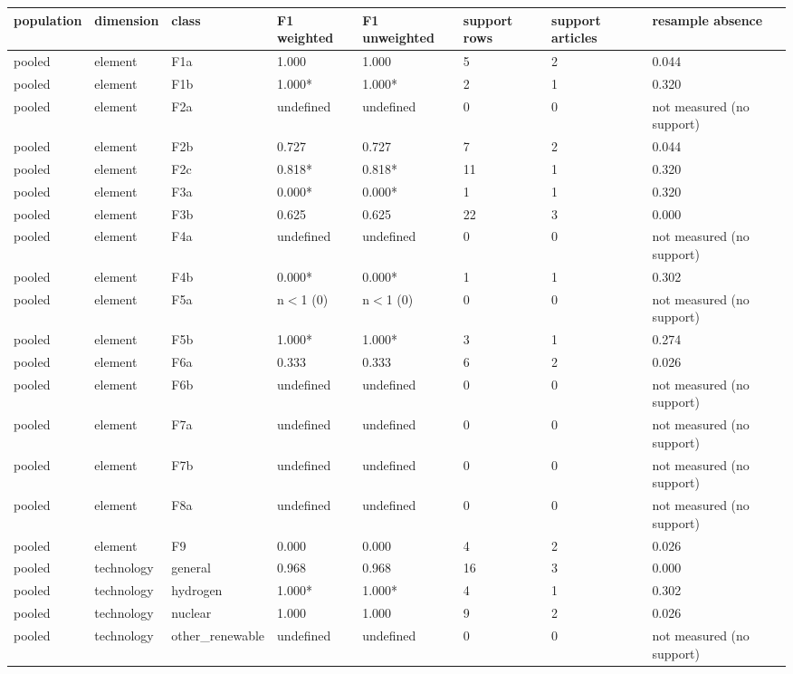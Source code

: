 \begin{table}[htbp]
\centering
\small
\begin{tabular}{llllllll}
\toprule
\textbf{population} & \textbf{dimension} & \textbf{class} & \textbf{F1 weighted} & \textbf{F1 unweighted} & \textbf{support rows} & \textbf{support articles} & \textbf{resample absence} \\
\midrule
pooled & element & F1a & 1.000 & 1.000 & 5 & 2 & 0.044 \\
pooled & element & F1b & 1.000* & 1.000* & 2 & 1 & 0.320 \\
pooled & element & F2a & undefined & undefined & 0 & 0 & not measured (no support) \\
pooled & element & F2b & 0.727 & 0.727 & 7 & 2 & 0.044 \\
pooled & element & F2c & 0.818* & 0.818* & 11 & 1 & 0.320 \\
pooled & element & F3a & 0.000* & 0.000* & 1 & 1 & 0.320 \\
pooled & element & F3b & 0.625 & 0.625 & 22 & 3 & 0.000 \\
pooled & element & F4a & undefined & undefined & 0 & 0 & not measured (no support) \\
pooled & element & F4b & 0.000* & 0.000* & 1 & 1 & 0.302 \\
pooled & element & F5a & n$<$1 (0) & n$<$1 (0) & 0 & 0 & not measured (no support) \\
pooled & element & F5b & 1.000* & 1.000* & 3 & 1 & 0.274 \\
pooled & element & F6a & 0.333 & 0.333 & 6 & 2 & 0.026 \\
pooled & element & F6b & undefined & undefined & 0 & 0 & not measured (no support) \\
pooled & element & F7a & undefined & undefined & 0 & 0 & not measured (no support) \\
pooled & element & F7b & undefined & undefined & 0 & 0 & not measured (no support) \\
pooled & element & F8a & undefined & undefined & 0 & 0 & not measured (no support) \\
pooled & element & F9 & 0.000 & 0.000 & 4 & 2 & 0.026 \\
pooled & technology & general & 0.968 & 0.968 & 16 & 3 & 0.000 \\
pooled & technology & hydrogen & 1.000* & 1.000* & 4 & 1 & 0.302 \\
pooled & technology & nuclear & 1.000 & 1.000 & 9 & 2 & 0.026 \\
pooled & technology & other\_renewable & undefined & undefined & 0 & 0 & not measured (no support) \\

\end{tabular}
\end{table}
